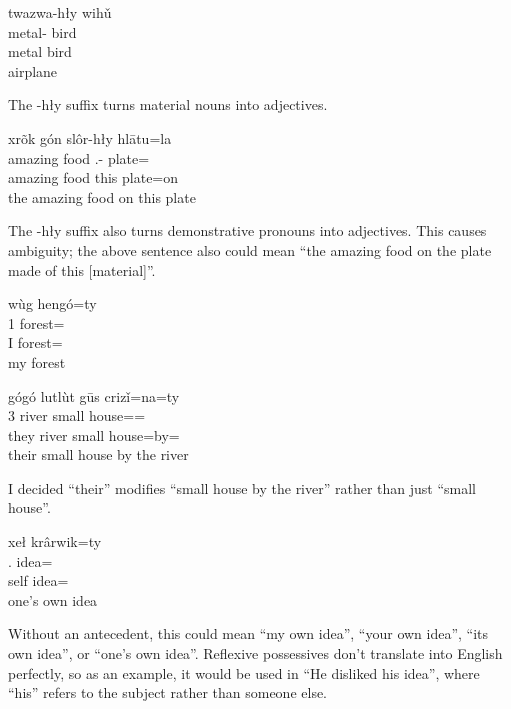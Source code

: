 \begin{exe}
    \ex
    \glll
    twazwa-hły wihǔ \\
    metal-\Adj{} bird \\
    metal bird \\
    \glt
    airplane
\end{exe}
The -hły suffix turns material nouns into adjectives.

\begin{exe}
    \ex
    \glll
    xrõk gón slôr-hły hlātu=la \\
    amazing food \Dem{}.\Prox{}-\Adj{} plate=\AdessThree{} \\
    amazing food this plate=on \\
    \glt
    the amazing food on this plate
\end{exe}
The -hły suffix also turns demonstrative pronouns into adjectives.
This causes ambiguity;
the above sentence also could mean
``the amazing food on the plate made of this [material]''.

\begin{exe}
    \ex
    \glll
    wùg hengó=ty \\
    1\Sg{} forest=\Poss{} \\
    I forest=\Poss{} \\
    \glt
    my forest
\end{exe}

\begin{exe}
    \ex
    \glll
    gógó lutlùt gūs crizǐ=na=ty \\
    3\Pl{} river small house=\AdessTwo{}=\Poss{}  \\
    they river small house=by=\Poss{} \\
    \glt
    their small house by the river
\end{exe}
I decided ``their'' modifies ``small house by the river'' rather than just ``small house''.

\begin{exe}
    \ex
    \glll
    xeł krârwik=ty  \\
    \Refl{}.\Sg{} idea=\Poss{} \\
    self idea=\Poss{} \\
    \glt
    one's own idea
\end{exe}
Without an antecedent, this could mean
``my own idea'',
``your own idea'',
``its own idea'',
or
``one's own idea''.
Reflexive possessives don't translate into English perfectly,
so as an example,
it would be used in
``He disliked his idea'',
where ``his'' refers to the subject rather than someone else.


